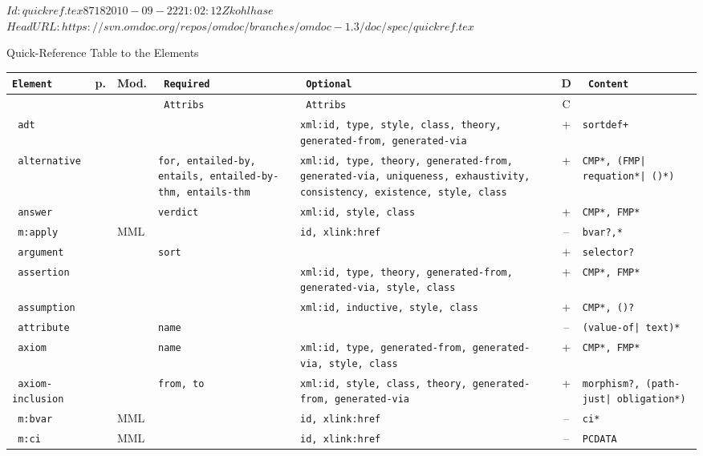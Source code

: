 \svnInfo $Id: quickref.tex 8718 2010-09-22 21:02:12Z kohlhase $
\svnKeyword $HeadURL: https://svn.omdoc.org/repos/omdoc/branches/omdoc-1.3/doc/spec/quickref.tex $

\begin{tchapter}[id=table,short=Quick-Reference]{Quick-Reference Table to the {\omdoc} Elements}
\def\tabelt#1#2#3#4#5#6{{#1}&\pageref{eldef:#1}&{#2}&{#3}&{#4}&{#5}&{#6}\\\hline}
\def\mathmlcat{MML}\def\omcat{OM}
 {\scriptsize\begin{longtable}{|>{\tt}p{1.8cm}|l|l|>{\tt}p{1.8cm}|>{\tt}p{1.8cm}|c|>{\tt}p{2.2cm}|}\hline
{\rm Element}& p. & Mod.  & {\rm Required}  & {\rm Optional} & D & Content \\\hline
             & &        & {\rm Attribs}  & {\rm Attribs} & C &        \\\hline\hline
\tabelt{adt}{\ADTmodule{spec}}{}{xml:id, type, style, class, theory, generated-from, generated-via}{+}{sortdef+}
\tabelt{alternative}{\STmodule{spec}}{for, entailed-by, entails,
             entailed-by-thm, entails-thm}{xml:id, type, theory,
  generated-from, generated-via, uniqueness, exhaustivity, consistency, existence,
             style, class}{+}{CMP*, (FMP| requation*| ({\mobjabbr})*)}
\tabelt{answer}{\QUIZmodule{spec}}{verdict}{xml:id, style, class}{+}{CMP*, FMP*}
\tabelt{m:apply}\mathmlcat{}{id, xlink:href}{--}{bvar?,\llquote{CMel}*}
\tabelt{argument}{\ADTmodule{spec}}{sort}{}{+}{selector?}
\tabelt{assertion}{\STmodule{spec}}{}{xml:id, type, theory,
  generated-from, generated-via, style, class}{+}{CMP*, FMP*}
\tabelt{assumption}{\MTXTmodule{spec}}{}{xml:id, inductive, style, class}{+}{CMP*, (\mobjabbr)?}
\tabelt{attribute}{\PRESmodule{spec}}{name}{}{--}{(value-of| text)*}
\tabelt{axiom}{\STmodule{spec}}{name}{xml:id, type, generated-from, generated-via, style, class}{+}{CMP*, FMP*}
\tabelt{axiom-inclusion}{\CTHmodule{spec}}{from, to}{xml:id, style, class, theory,
  generated-from, generated-via}{+}{morphism?, (path-just| obligation*)}\hline
\tabelt{m:bvar}\mathmlcat{}{id, xlink:href}{--}{ci*}
\tabelt{m:ci}\mathmlcat{}{id, xlink:href}{--}{PCDATA}

\end{longtable}}
\end{tchapter}
